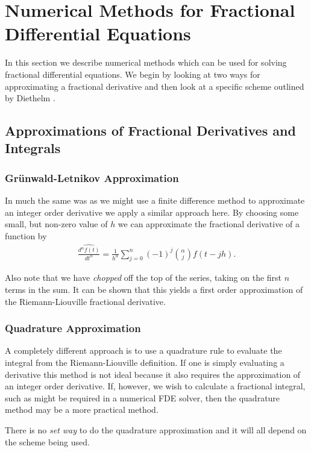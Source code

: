
\section{Numerical Methods for Fractional Differential Equations}

In this section we describe numerical methods which can be used for solving fractional differential equations. We begin by looking at two ways for approximating a fractional derivative and then look at a specific scheme outlined by Diethelm \cite{Diethelm2011}.

\subsection{Approximations of Fractional Derivatives and Integrals}

\subsubsection{Gr\"{u}nwald-Letnikov Approximation}
In much the same was as we might use a finite difference method to approximate an integer order derivative we apply a similar approach here. By choosing some small, but non-zero value of $ h $ we can approximate the fractional derivative of a function by
\begin{align}
    \widehat{ \frac{d^\alpha f(t)}{dt^\alpha} } = \frac{1}{h^\alpha} \sum_{j=0}^n (-1)^j {\alpha \choose j} f(t - jh).
\end{align}

Also note that we have \emph{chopped} off the top of the series, taking on the first $ n $ terms in the sum. 
It can be shown \cite{Podlubny1999} that this yields a first order approximation of the Riemann-Liouville fractional derivative.
\subsubsection{Quadrature Approximation}
A completely different approach is to use a quadrature rule to evaluate the integral from the Riemann-Liouville definition. If one is simply evaluating a derivative this method is not ideal because it also requires the approximation of an integer order derivative. If, however, we wish to calculate a fractional integral, such as might be required in a numerical FDE solver, then the quadrature method may be a more practical method.

There is no \emph{set way} to do the quadrature approximation and it will all depend on the scheme being used. 

